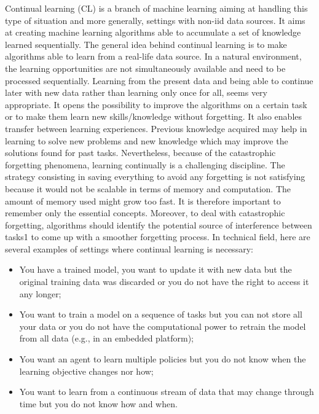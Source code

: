 \documentclass[english, LaM, oneside]{sapthesis}%
\begin{document}
\newline \newline
Continual learning (CL) is a branch of machine learning aiming at handling this type of situation and more generally, settings with non-iid data sources. It aims at creating machine learning algorithms able to accumulate a set of knowledge learned sequentially. The general idea behind continual learning is to make algorithms able to learn from a real-life data source. In a natural environment, the learning opportunities are not simultaneously available and need to be processed sequentially. Learning from the present data and being able to continue later with new data rather than learning only once for all, seems very appropriate. It opens the possibility to improve the algorithms on a certain task or to make them learn new skills/knowledge without forgetting. It also enables transfer between learning experiences. Previous knowledge acquired may help in learning to solve new problems and new knowledge which may improve the solutions found for past tasks. Nevertheless, because of the catastrophic forgetting phenomena, learning continually is a challenging discipline. The strategy consisting in saving everything to avoid any forgetting is not satisfying because it would not be scalable in terms of memory and computation. The amount of memory used might grow too fast. It is therefore important to remember only the essential concepts. Moreover, to deal with catastrophic forgetting, algorithms should identify the potential source of interference between tasks1 to come up with a smoother forgetting process.
\newline \newline
In technical field, here are several examples of settings where continual learning is necessary:
\begin{itemize}
\item You have a trained model, you want to update it with new data but the original training data was discarded or you do not have the right to access it any longer;
\item You want to train a model on a sequence of tasks but you can not store all your data or you do not have the computational power to retrain the model from all data (e.g., in an embedded platform);
\item You want an agent to learn multiple policies but you do not know when the learning objective changes nor how;
\item You want to learn from a continuous stream of data that may change through time but you do not know how and when.
\end{itemize}
\end{document}
